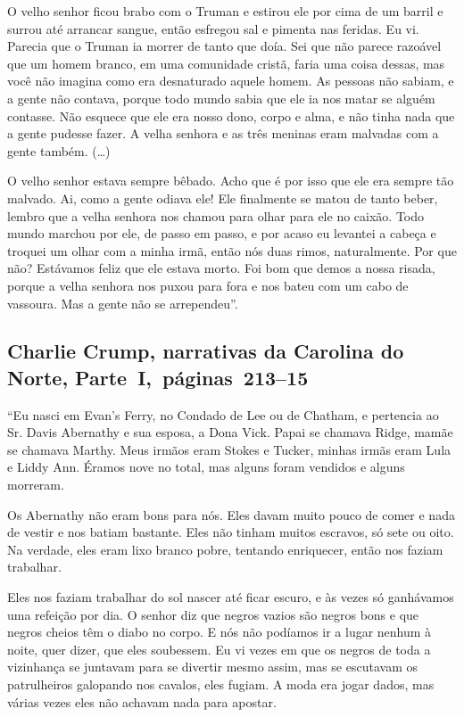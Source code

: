 O velho senhor ficou brabo com o Truman e estirou ele por cima de um
barril e surrou até arrancar sangue, então esfregou sal e pimenta nas
feridas. Eu vi. Parecia que o Truman ia morrer de tanto que doía. Sei
que não parece razoável que um homem branco, em uma comunidade cristã,
faria uma coisa dessas, mas você não imagina como era desnaturado aquele
homem. As pessoas não sabiam, e a gente não contava, porque todo mundo
sabia que ele ia nos matar se alguém contasse. Não esquece que ele era
nosso dono, corpo e alma, e não tinha nada que a gente pudesse fazer. A
velha senhora e as três meninas eram malvadas com a gente também.
(\ldots{})

O velho senhor estava sempre bêbado. Acho que é por isso que ele era
sempre tão malvado. Ai, como a gente odiava ele! Ele finalmente se matou
de tanto beber, lembro que a velha senhora nos chamou para olhar para
ele no caixão. Todo mundo marchou por ele, de passo em passo, e por
acaso eu levantei a cabeça e troquei um olhar com a minha irmã, então
nós duas rimos, naturalmente. Por que não? Estávamos feliz que ele
estava morto. Foi bom que demos a nossa risada, porque a velha senhora
nos puxou para fora e nos bateu com um cabo de vassoura. Mas a gente não
se arrependeu''.

\subsection{Charlie Crump, narrativas da Carolina do Norte, Parte~I,~páginas~213--15} \label{ref63}

``Eu nasci em Evan's Ferry, no Condado de Lee ou de Chatham, e pertencia
ao Sr. Davis Abernathy e sua esposa, a Dona Vick. Papai se chamava
Ridge, mamãe se chamava Marthy. Meus irmãos eram Stokes e Tucker, minhas
irmãs eram Lula e Liddy Ann. Éramos nove no total, mas alguns foram
vendidos e alguns morreram.

Os Abernathy não eram bons para nós. Eles davam muito pouco de comer e
nada de vestir e nos batiam bastante. Eles não tinham muitos escravos,
só sete ou oito. Na verdade, eles eram lixo branco pobre, tentando
enriquecer, então nos faziam trabalhar.

Eles nos faziam trabalhar do sol nascer até ficar escuro, e às vezes só
ganhávamos uma refeição por dia. O senhor diz que negros vazios são
negros bons e que negros cheios têm o diabo no corpo. E nós não podíamos
ir a lugar nenhum à noite, quer dizer, que eles soubessem. Eu vi vezes
em que os negros de toda a vizinhança se juntavam para se divertir mesmo
assim, mas se escutavam os patrulheiros galopando nos cavalos, eles
fugiam. A moda era jogar dados, mas várias vezes eles não achavam nada
para apostar.

